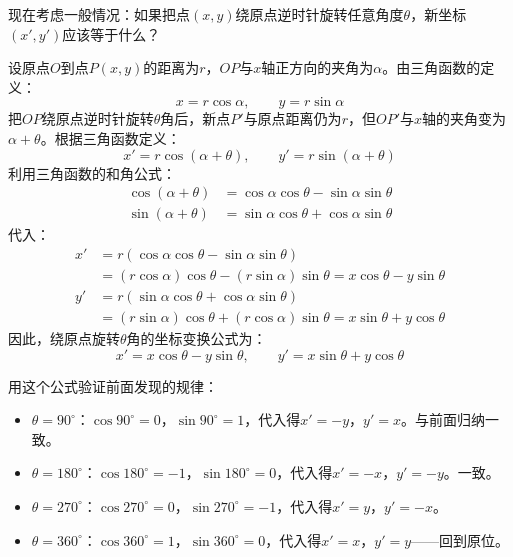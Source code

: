现在考虑一般情况：如果把点$(x,y)$绕原点逆时针旋转任意角度$\theta$，新坐标$(x',y')$应该等于什么？

设原点$O$到点$P(x,y)$的距离为$r$，$OP$与$x$轴正方向的夹角为$\alpha$。由三角函数的定义：
\[
x = r\cos\alpha,\qquad y = r\sin\alpha
\]
把$OP$绕原点逆时针旋转$\theta$角后，新点$P'$与原点距离仍为$r$，但$OP'$与$x$轴的夹角变为$\alpha+\theta$。根据三角函数定义：
\[
x' = r\cos(\alpha+\theta),\qquad y' = r\sin(\alpha+\theta)
\]
利用三角函数的和角公式：
\begin{align*}
\cos(\alpha+\theta) &= \cos\alpha\cos\theta - \sin\alpha\sin\theta\\
\sin(\alpha+\theta) &= \sin\alpha\cos\theta + \cos\alpha\sin\theta
\end{align*}
代入：
\begin{align*}
x' &= r(\cos\alpha\cos\theta - \sin\alpha\sin\theta)\\
   &= (r\cos\alpha)\cos\theta - (r\sin\alpha)\sin\theta
    = x\cos\theta - y\sin\theta\\[2mm]
y' &= r(\sin\alpha\cos\theta + \cos\alpha\sin\theta)\\
   &= (r\sin\alpha)\cos\theta + (r\cos\alpha)\sin\theta
    = x\sin\theta + y\cos\theta
\end{align*}
因此，绕原点旋转$\theta$角的坐标变换公式为：
\[
x' = x\cos\theta - y\sin\theta,\qquad
y' = x\sin\theta + y\cos\theta
\]

用这个公式验证前面发现的规律：
\begin{itemize}
\item $\theta=90^\circ$：$\cos90^\circ=0$，$\sin90^\circ=1$，代入得$x'=-y$，$y'=x$。与前面归纳一致。
\item $\theta=180^\circ$：$\cos180^\circ=-1$，$\sin180^\circ=0$，代入得$x'=-x$，$y'=-y$。一致。
\item $\theta=270^\circ$：$\cos270^\circ=0$，$\sin270^\circ=-1$，代入得$x'=y$，$y'=-x$。
\item $\theta=360^\circ$：$\cos360^\circ=1$，$\sin360^\circ=0$，代入得$x'=x$，$y'=y$——回到原位。
\end{itemize}

\begin{center}
\end{center}

